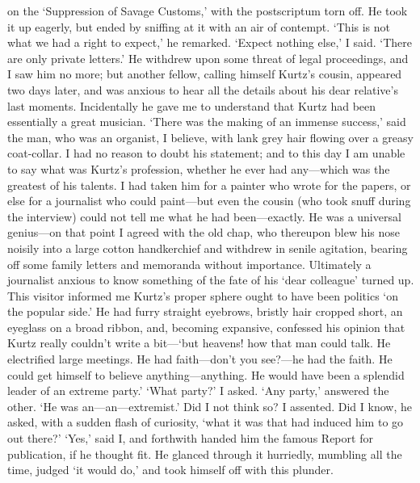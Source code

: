 \documentclass[12pt]{report}
\begin{document}
on the `Suppression of Savage Customs,' with the postscriptum torn off.
He took it up eagerly, but ended by sniffing at it with an air of
contempt. `This is not what we had a right to expect,' he remarked.
`Expect nothing else,' I said. `There are only private letters.' He
withdrew upon some threat of legal proceedings, and I saw him no more;
but another fellow, calling himself Kurtz's cousin, appeared two days
later, and was anxious to hear all the details about his dear relative's
last moments. Incidentally he gave me to understand that Kurtz had been
essentially a great musician. `There was the making of an immense
success,' said the man, who was an organist, I believe, with lank grey
hair flowing over a greasy coat-collar. I had no reason to doubt his
statement; and to this day I am unable to say what was Kurtz's
profession, whether he ever had any---which was the greatest of his
talents. I had taken him for a painter who wrote for the papers, or else
for a journalist who could paint---but even the cousin (who took snuff
during the interview) could not tell me what he had been---exactly. He
was a universal genius---on that point I agreed with the old chap, who
thereupon blew his nose noisily into a large cotton handkerchief and
withdrew in senile agitation, bearing off some family letters and
memoranda without importance. Ultimately a journalist anxious to know
something of the fate of his `dear colleague' turned up. This visitor
informed me Kurtz's proper sphere ought to have been politics `on the
popular side.' He had furry straight eyebrows, bristly hair cropped
short, an eyeglass on a broad ribbon, and, becoming expansive, confessed
his opinion that Kurtz really couldn't write a bit---`but heavens! how
that man could talk. He electrified large meetings. He had faith---don't
you see?---he had the faith. He could get himself to believe
anything---anything. He would have been a splendid leader of an extreme
party.' `What party?' I asked. `Any party,' answered the other. `He was
an---an---extremist.' Did I not think so? I assented. Did I know, he
asked, with a sudden flash of curiosity, `what it was that had induced
him to go out there?' `Yes,' said I, and forthwith handed him the famous
Report for publication, if he thought fit. He glanced through it
hurriedly, mumbling all the time, judged `it would do,' and took himself
off with this plunder.
\end{document}
